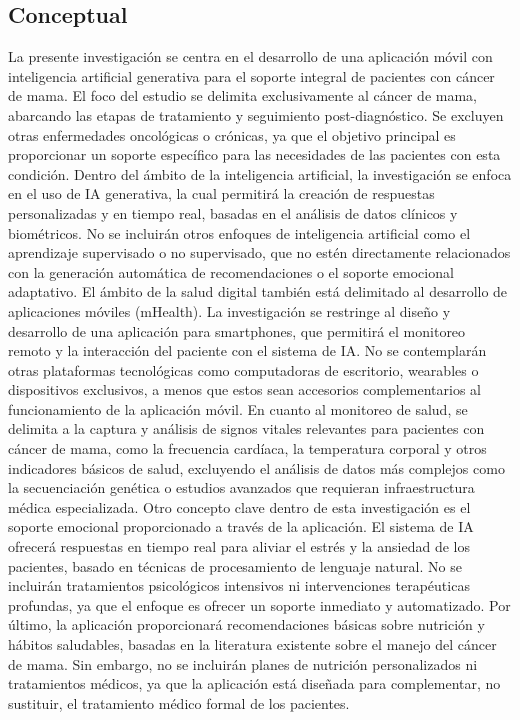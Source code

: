 \subsection{Conceptual}
La presente investigación se centra en el desarrollo de una aplicación móvil con inteligencia artificial generativa para el soporte integral de pacientes con cáncer de mama. El foco del estudio se delimita exclusivamente al cáncer de mama, abarcando las etapas de tratamiento y seguimiento post-diagnóstico. Se excluyen otras enfermedades oncológicas o crónicas, ya que el objetivo principal es proporcionar un soporte específico para las necesidades de las pacientes con esta condición. Dentro del ámbito de la inteligencia artificial, la investigación se enfoca en el uso de IA generativa, la cual permitirá la creación de respuestas personalizadas y en tiempo real, basadas en el análisis de datos clínicos y biométricos. No se incluirán otros enfoques de inteligencia artificial como el aprendizaje supervisado o no supervisado, que no estén directamente relacionados con la generación automática de recomendaciones o el soporte emocional adaptativo.
El ámbito de la salud digital también está delimitado al desarrollo de aplicaciones móviles (mHealth). La investigación se restringe al diseño y desarrollo de una aplicación para smartphones, que permitirá el monitoreo remoto y la interacción del paciente con el sistema de IA. No se contemplarán otras plataformas tecnológicas como computadoras de escritorio, wearables o dispositivos exclusivos, a menos que estos sean accesorios complementarios al funcionamiento de la aplicación móvil. En cuanto al monitoreo de salud, se delimita a la captura y análisis de signos vitales relevantes para pacientes con cáncer de mama, como la frecuencia cardíaca, la temperatura corporal y otros indicadores básicos de salud, excluyendo el análisis de datos más complejos como la secuenciación genética o estudios avanzados que requieran infraestructura médica especializada.
Otro concepto clave dentro de esta investigación es el soporte emocional proporcionado a través de la aplicación. El sistema de IA ofrecerá respuestas en tiempo real para aliviar el estrés y la ansiedad de los pacientes, basado en técnicas de procesamiento de lenguaje natural. No se incluirán tratamientos psicológicos intensivos ni intervenciones terapéuticas profundas, ya que el enfoque es ofrecer un soporte inmediato y automatizado. Por último, la aplicación proporcionará recomendaciones básicas sobre nutrición y hábitos saludables, basadas en la literatura existente sobre el manejo del cáncer de mama. Sin embargo, no se incluirán planes de nutrición personalizados ni tratamientos médicos, ya que la aplicación está diseñada para complementar, no sustituir, el tratamiento médico formal de los pacientes.


